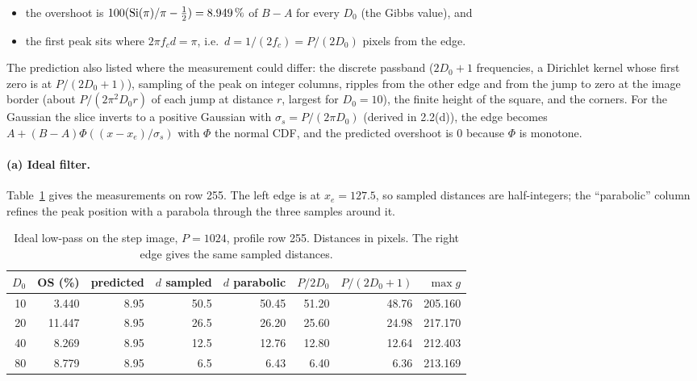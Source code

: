 \begin{itemize}
\item the overshoot is $100(\operatorname{Si}(\pi)/\pi-\tfrac12)=8.949\,\%$ of $B-A$ for every
$D_0$ (the Gibbs value), and
\item the first peak sits where $2\pi f_cd=\pi$, i.e.\ $d=1/(2f_c)=P/(2D_0)$
pixels from the edge.
\end{itemize}

The prediction also listed where the measurement could differ: the discrete
passband ($2D_0+1$ frequencies, a Dirichlet kernel whose first zero is at
$P/(2D_0+1)$), sampling of the peak on integer columns, ripples from the other
edge and from the jump to zero at the image border (about $P/(2\pi^2D_0r)$ of
each jump at distance $r$, largest for $D_0=10$), the finite height of the
square, and the corners. For the Gaussian the slice inverts to a positive
Gaussian with $\sigma_s=P/(2\pi D_0)$ (derived in 2.2(d)), the edge becomes
$A+(B-A)\Phi((x-x_e)/\sigma_s)$ with $\Phi$ the normal CDF, and the predicted
overshoot is 0 because $\Phi$ is monotone.

\paragraph{(a) Ideal filter.} Table~\ref{tab:ringing} gives the measurements on
row 255. The left edge is at $x_e=127.5$, so sampled distances are
half-integers; the ``parabolic'' column refines the peak position with a
parabola through the three samples around it.

\begin{table}[H]
\centering
\begin{tabular}{rrrrrrrr}
\toprule
$D_0$ & OS (\%) & predicted & $d$ sampled & $d$ parabolic & $P/2D_0$ & $P/(2D_0+1)$ & $\max g$\\
\midrule
10 & 3.440 & 8.95 & 50.5 & 50.45 & 51.20 & 48.76 & 205.160\\
20 & 11.447 & 8.95 & 26.5 & 26.20 & 25.60 & 24.98 & 217.170\\
40 & 8.269 & 8.95 & 12.5 & 12.76 & 12.80 & 12.64 & 212.403\\
80 & 8.779 & 8.95 & 6.5 & 6.43 & 6.40 & 6.36 & 213.169\\
\bottomrule
\end{tabular}
\caption{Ideal low-pass on the step image, $P=1024$, profile row 255. Distances
in pixels. The right edge gives the same sampled distances.}
\label{tab:ringing}
\end{table}

